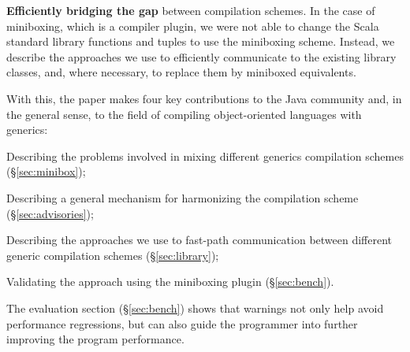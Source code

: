\textbf{Efficiently bridging the gap} between compilation schemes. In the case of miniboxing, which is a compiler plugin, we were not able to change the Scala standard library functions and tuples to use the miniboxing scheme. Instead, we describe the approaches we use to efficiently communicate to the existing library classes, and, where necessary, to replace them by miniboxed equivalents.

With this, the paper makes four key contributions to the Java community and, in the general sense, to the field of compiling object-oriented languages with generics:

\begin{compactitem}
  \item Describing the problems involved in mixing different generics compilation schemes (\S\ref{sec:minibox});
  \item Describing a general mechanism for harmonizing the compilation scheme (\S\ref{sec:advisories});
  \item Describing the approaches we use to fast-path communication between different generic compilation schemes (\S\ref{sec:library});
  \item Validating the approach using the miniboxing plugin (\S\ref{sec:bench}).
\end{compactitem}

The evaluation section (\S\ref{sec:bench}) shows that warnings not only help avoid performance regressions, but can also guide the programmer into further improving the program performance.